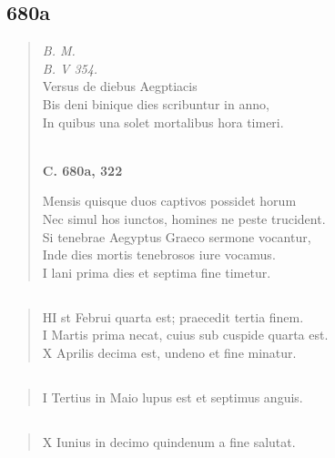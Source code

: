 \documentclass[11pt, a4paper]{report}
\begin{document}
            \subsection*{680a}
      \begin{verse}
      \textit{B. M.} \\ \textit{B. V 354.} \\ Versus de diebus Aegptiacis \\ Bis deni binique dies scribuntur in anno, \\ In quibus una solet mortalibus hora timeri. \\ 
        ﻿\pagebreak 
    \begin{center} \textbf{C. 680a, 322} \end{center} \marginpar{[157]} Mensis quisque duos captivos possidet horum \\ Nec simul hos iunctos, homines ne peste trucident. \\ Si tenebrae Aegyptus Graeco sermone vocantur, \\ Inde dies mortis tenebrosos iure vocamus. \\ I lani prima dies et septima fine timetur. \\ 
      \end{verse}
  
            \subsection*{}
      \begin{verse}
      HI st Februi quarta est; praecedit tertia finem. \\ I Martis prima necat, cuius sub cuspide quarta est. \\ X Aprilis decima est, undeno et fine minatur. \\ 
      \end{verse}
  
            \subsection*{}
      \begin{verse}
       \lbrack I Tertius in Maio lupus est et septimus anguis. \\ 
      \end{verse}
  
            \subsection*{}
      \begin{verse}
      X Iunius in decimo quindenum a fine salutat. \\ 
      \end{verse}
  
\end{document}

